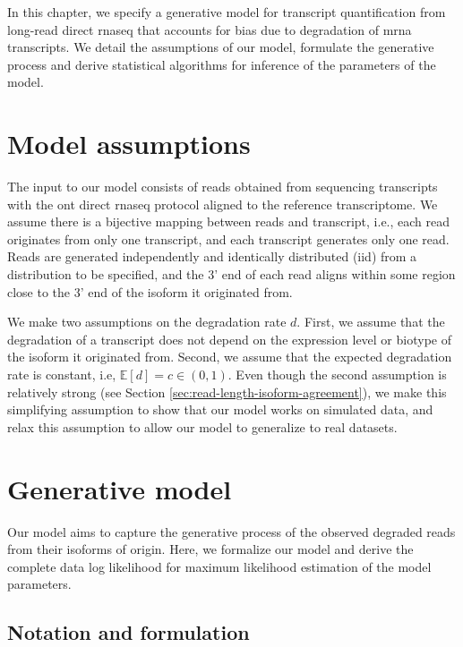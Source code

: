 
In this chapter, we specify a generative model for transcript quantification from long-read direct \gls{rnaseq} that accounts for bias due to degradation of \gls{mrna} transcripts. We detail the assumptions of our model, formulate the generative process and derive statistical algorithms for inference of the parameters of the model.  

\section{Model assumptions}\label{sec:model-assumptions}

The input to our model consists of reads obtained from sequencing transcripts with the \gls{ont} direct \gls{rnaseq} protocol aligned to the reference transcriptome. We assume there is a bijective mapping between reads and transcript, i.e., each read originates from only one transcript, and each transcript generates only one read. Reads are generated independently and identically distributed (iid) from a distribution to be specified, and the 3' end of each read aligns within some region close to the 3' end of the isoform it originated from.

We make two assumptions on the degradation rate $d$. First, we assume that the degradation of a transcript does not depend on the expression level or biotype of the isoform it originated from. Second, we assume that the expected degradation rate is constant, i.e, $\mathbb{E}[d]=c\in(0,1)$. Even though the second assumption is relatively strong (see Section \ref{sec:read-length-isoform-agreement}), we make this simplifying assumption to show that our model works on simulated data, and relax this assumption to allow our model to generalize to real datasets. 

\section{Generative model}\label{sec:generative-model}

Our model aims to capture the generative process of the observed degraded reads from their isoforms of origin. Here, we formalize our model and derive the complete data log likelihood for maximum likelihood estimation of the model parameters. 

\subsection{Notation and formulation}\label{sec:notation-and-formulation}

